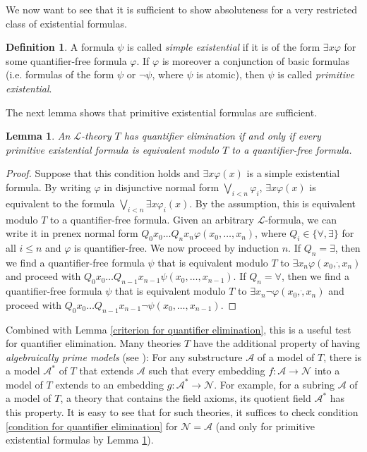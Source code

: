 \documentclass[10pt]{amsart}
\renewcommand{\L}{\mathcal{L}}
\newcommand{\NN}{\mathcal{N}}
\renewcommand{\AA}{\mathcal{A}}
\newtheorem{lemma}[theorem]{Lemma}
\theoremstyle{definition}
\newtheorem{definition}[theorem]{Definition}
\theoremstyle{remark}
\begin{document}
We now want to see that it is sufficient to show absoluteness for a very restricted class of existential formulas. 

\begin{definition} 
A formula $\psi$ is called \emph{simple existential} if it is of the form $\exists x \varphi$ for some quantifier-free formula $\varphi$. If $\varphi$ is moreover a conjunction of basic formulas (i.e. formulas of the form $\psi$ or $\neg\psi$, where $\psi$ is atomic), then $\psi$ is called \emph{primitive existential}. 
\end{definition} 

The next lemma shows that primitive existential formulas are sufficient.  

\begin{lemma} \label{quantifier elimination using primitive existential formulas}
An $\L$-theory $T$ has quantifier elimination if and only if every primitive existential formula is equivalent modulo $T$ to a quantifier-free formula. 
\end{lemma} 
\begin{proof} 
Suppose that this condition holds and $\exists x \varphi(x)$ is a simple existential formula. By writing $\varphi$ in disjunctive normal form $\bigvee_{i<n} \varphi_i$, $\exists x \varphi(x)$ is equivalent to the formula $\bigvee_{i<n}\exists x \varphi_i(x)$. By the assumption, this is equivalent modulo $T$ to a quantifier-free formula. 
Given an arbitrary $\L$-formula, we can write it in prenex normal form $Q_0 x_0\dots Q_n x_n\varphi(x_0,\dots,x_n)$, where $Q_i\in\{\forall,\exists\}$ for all $i\leq n$ and $\varphi$ is quantifier-free. We now proceed by induction $n$. If $Q_n=\exists$, then we find a quantifier-free formula $\psi$ that is equivalent modulo $T$ to $\exists x_n \varphi(x_0,\dot,x_n)$ and proceed with $Q_0 x_0\dots Q_{n-1} x_{n-1}\psi(x_0,\dots,x_{n-1})$. If $Q_n=\forall$, then we find a quantifier-free formula $\psi$ that is equivalent modulo $T$ to $\exists x_n \neg\varphi(x_0,\dot,x_n)$ and proceed with $Q_0 x_0\dots Q_{n-1} x_{n-1}\neg\psi(x_0,\dots,x_{n-1})$. 
\end{proof} 

Combined with Lemma \ref{criterion for quantifier elimination}, this is a useful test for quantifier elimination. Many theories $T$ have the additional property of having \emph{algebraically prime models} (see \cite[p. 78]{MR1924282}): For any substructure $\AA$ of a model of $T$, there is a model $\AA^*$ of $T$ that extends $\AA$ such that every embedding $f\colon \AA\rightarrow \NN$ into a model of $T$ extends to an embedding $g\colon \AA^*\rightarrow \NN$. For example, for a subring $\AA$ of a model of $T$, a theory that contains the field axioms, its quotient field $\AA^*$ has this property. It is easy to see that for such theories, it suffices to check condition \ref{condition for quantifier elimination} for $\NN=\AA$ (and only for primitive existential formulas by Lemma \ref{quantifier elimination using primitive existential formulas}). 
\end{document}
